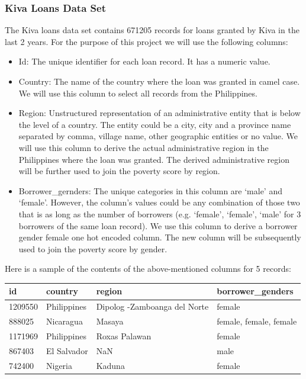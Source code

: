 \documentclass{article}
\begin{document}
\subsubsection{Kiva Loans Data Set}
The Kiva loans data set contains 671205 records for loans granted by Kiva in the last 2 years. For the purpose of this project we will use the following columns:
\begin{itemize}
  \item Id: The unique identifier for each loan record. It has a numeric value.
  \item Country: The name of the country where the loan was granted in camel case. We will use this column to select all records from the Philippines.
  \item Region: Unstructured representation of an administrative entity that is below the level of a country. The entity could be a city, city and a province name separated by comma, village name, other geographic entities or no value. We will use this column to derive the actual administrative region in the Philippines where the loan was granted. The derived administrative region will be further used to join the poverty score by region.
  \item Borrower\_gernders: The unique categories in this column are ‘male’ and ‘female’. However, the column’s values could be any combination of those two that is as long as the number of borrowers (e.g. ‘female’, ‘female’, ‘male’ for 3 borrowers of the same loan record). We use this column to derive a borrower gender female one hot encoded column. The new column will be subsequently used to join the poverty score by gender.
\end{itemize}
Here is a sample of the contents of the above-mentioned columns for 5 records:

\begin{center}
\begin{tabular}{ |l|l|l|l| }
  \hline
  id & country & region & borrower\_genders \\
  \hline
  1209550 & Philippines & Dipolog -Zamboanga del Norte & female \\
  888025 & Nicaragua & Masaya & female, female, female \\
  1171969 & Philippines & Roxas Palawan & female \\
  867403 & El Salvador & NaN & male \\
  742400 & Nigeria & Kaduna & female \\
  \hline
\end{tabular}
\end{center}
\end{document}
